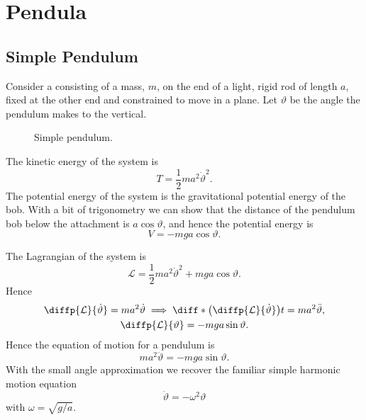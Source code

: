 \documentclass[fleqn]{NotesClass}
\newcommand*{\lagrangian}{\mathcal{L}}
\begin{document}
    \section{Pendula}
    \subsection{Simple Pendulum}
    Consider a  consisting of a mass, \(m\), on the end of a light, rigid rod of length \(a\), fixed at the other end and constrained to move in a plane.
    Let \(\vartheta\) be the angle the pendulum makes to the vertical.
    
    \begin{figure}
        \caption{Simple pendulum.}
    \end{figure}
    
    The kinetic energy of the system is
    \begin{equation}
        T = \frac{1}{2}ma^2\dot{\vartheta}^2.
    \end{equation}
    The potential energy of the system is the gravitational potential energy of the bob.
    With a bit of trigonometry we can show that the distance of the pendulum bob below the attachment is \(a\cos\vartheta\), and hence the potential energy is
    \begin{equation}
        V = -mga\cos\vartheta.
    \end{equation}

    The Lagrangian of the system is
    \begin{equation}
        \lagrangian = \frac{1}{2}ma^2\dot{\vartheta}^2 + mga\cos\vartheta.
    \end{equation}
    Hence
    \begin{gather}
        \diffp{\lagrangian}{\dot{\vartheta}} = ma^2\dot{\vartheta} \implies \diff*{\left( \diffp{\lagrangian}{\dot{\vartheta}} \right)}{t} = ma^2\ddot{\vartheta},\\
        \diffp{\lagrangian}{\vartheta} = -mga\sin\vartheta.
    \end{gather}
    Hence the equation of motion for a pendulum is
    \begin{equation}
        ma^2\ddot{\vartheta} = -mga\sin\vartheta.
    \end{equation}
    With the small angle approximation we recover the familiar simple harmonic motion equation
    \begin{equation}
        \ddot{\vartheta} = -\omega^2\vartheta
    \end{equation}
    with \(\omega = \sqrt{g/a}\).
    
\end{document}
